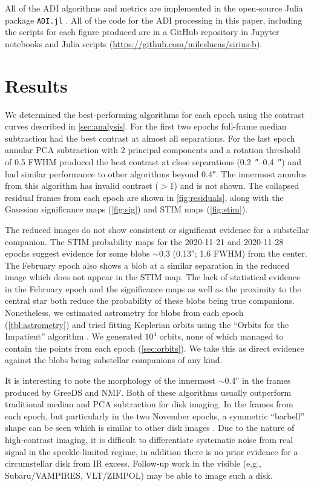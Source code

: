\documentclass[twocolumn]{aastex631}
\begin{document}
All of the ADI algorithms and metrics are implemented in the open-source Julia package \texttt{ADI.jl} \citep{lucas_adijl_2020}. All of the code for the ADI processing in this paper, including the scripts for each figure produced are in a GitHub repository in Jupyter notebooks and Julia scripts (\href{https://github.com/mileslucas/sirius-b}{https://github.com/mileslucas/sirius-b}).

\section{Results} \label{sec:results}

We determined the best-performing algorithms for each epoch using the contrast curves described in \autoref{sec:analysis}. For the first two epochs full-frame median subtraction had the best contrast at almost all separations. For the last epoch annular PCA subtraction with 2 principal components and a rotation threshold of 0.5 FWHM produced the best contrast at close separations (\qtyrange{0.2}{0.4}{\arcsecond}) and had similar performance to other algorithms beyond \ang{;;0.4}. The innermost annulus from this algorithm has invalid contrast ($>$1) and is not shown. The collapsed residual frames from each epoch are shown in \autoref{fig:residuals}, along with the Gaussian significance maps (\autoref{fig:sig}) and STIM maps (\autoref{fig:stim}).

The reduced images do not show consistent or significant evidence for a substellar companion. The STIM probability maps for the 2020-11-21 and 2020-11-28 epochs suggest evidence for some blobs $\sim$\qty{0.3}{\au} (\ang{;;0.13}; 1.6 FWHM) from the center. The February epoch also shows a blob at a similar separation in the reduced image which does not appear in the STIM map. The lack of statistical evidence in the February epoch and the significance maps as well as the proximity to the central star both reduce the probability of these blobs being true companions. Nonetheless, we estimated astrometry for blobs from each epoch (\autoref{tbl:astrometry}) and tried fitting Keplerian orbits using the ``Orbits for the Impatient'' algorithm \citep[OFTI;][]{blunt_orbits_2017}. We generated $10^4$ orbits, none of which managed to contain the points from each epoch (\autoref{sec:orbits}). We take this as direct evidence against the blobs being substellar companions of any kind.

It is interesting to note the morphology of the innermost $\sim$\ang{;;0.4} in the frames produced by GreeDS and NMF. Both of these algorithms usually outperform traditional median and PCA subtraction for disk imaging. In the frames from each epoch, but particularly in the two November epochs, a symmetric ``barbell'' shape can be seen which is similar to other disk images \citep[e.g., fig.~7][]{norris_vampires_2014}. Due to the nature of high-contrast imaging, it is difficult to differentiate systematic noise from real signal in the speckle-limited regime, in addition there is no prior evidence for a circumstellar disk from IR excess. Follow-up work in the visible (e.g., Subaru/VAMPIRES, VLT/ZIMPOL) may be able to image such a disk.
\end{document}
